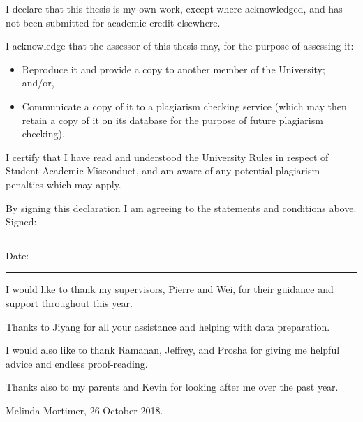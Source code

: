 \beforepreface



\vskip 10pc \noindent I declare that this thesis is my
own work, except where acknowledged, and has not been submitted for
academic credit elsewhere. 

\vskip 2pc  \noindent I acknowledge that the assessor of this
thesis may, for the purpose of assessing it:
\begin{itemize}
\item Reproduce it and provide a copy to another member of the University; and/or,
\item Communicate a copy of it to a plagiarism checking service (which may then retain a copy of it on its database for the purpose of future plagiarism checking).
\end{itemize}

\vskip 2pc \noindent I certify that I have read and understood the University Rules in
respect of Student Academic Misconduct, and am aware of any potential plagiarism penalties which may 
apply.\vspace{24pt}

\vskip 2pc \noindent By signing this declaration I am agreeing to the statements and conditions above.
\vskip 2pc
Signed: \rule{7cm}{0.25pt} \hfill Date: \rule{4cm}{0.25pt}

\afterpage{\cleardoublepage}




\bigskip I would like to thank my supervisors, Pierre and Wei, for their guidance and support throughout this year.

\bigskip\noindent Thanks to Jiyang for all your assistance and helping with data preparation.

\bigskip\noindent I would also like to thank Ramanan, Jeffrey, and Prosha for giving me helpful advice and endless proof-reading.

\bigskip\noindent Thanks also to my parents and Kevin for looking after me over the past year.

\bigskip\bigskip\bigskip\noindent Melinda Mortimer, 26 October 2018.

%
%
%
%

